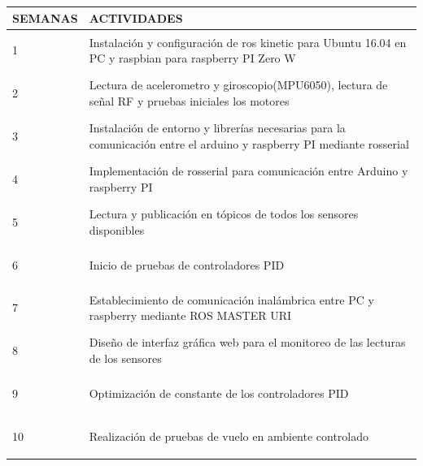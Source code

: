 \documentclass[letterpaper, 10 pt, conference]{ieeeconf}  %
\begin{document}
\begin{center}
 \begin{tabular}{|| m{1.5cm}  m{6cm}||} 
 \hline
 SEMANAS & ACTIVIDADES \\ [0.5ex] 
 \hline\hline
 \begin{center}1\end{center}  & Instalación y configuración de ros kinetic para Ubuntu 16.04 en PC y raspbian para raspberry PI Zero W \\
 \hline
 \begin{center}2\end{center} &  Lectura de acelerometro y giroscopio(MPU6050), lectura de señal RF y pruebas iniciales los motores\\
 \hline
 \begin{center}3\end{center} & Instalación de entorno y librerías necesarias para la comunicación entre el arduino y raspberry PI mediante rosserial \\
 \hline
 \begin{center}4\end{center} & Implementación de rosserial para comunicación entre Arduino y raspberry PI   \\
 \hline
 \begin{center}5\end{center} & Lectura y publicación en tópicos de todos los sensores disponibles \\
 \hline
 \begin{center}6\end{center} & Inicio de pruebas de controladores PID \\
 \hline
 \begin{center}7\end{center} & Establecimiento de  comunicación inalámbrica entre PC y raspberry mediante ROS MASTER URI \\
 \hline
 \begin{center}8\end{center} & Diseño de interfaz  gráfica web para el monitoreo de las lecturas de los sensores \\
 \hline
 \begin{center}9\end{center} & Optimización de constante de los controladores PID  \\
 \hline
 \begin{center}10\end{center} & Realización de pruebas de vuelo en ambiente controlado\\ [1ex] 
 \hline
\end{tabular}
\end{center}
\end{document}
